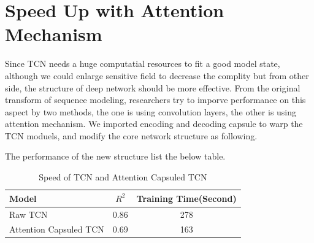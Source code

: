 \section{Speed Up with Attention Mechanism}
Since TCN needs a huge computatial resources to fit a good model state, although we could enlarge sensitive field to decrease the complity but from other side, the structure of deep network should be more effective. From the original transform of sequence modeling, researchers try to imporve performance on this aspect by two methods, the one is using convolution layers, the other is using attention mechanism. We imported encoding and decoding capsule to warp the TCN moduels, and modify the core network structure as following. 

The performance of the new structure list the below table.
\begin{table}[H]
\centering
\caption{Speed of TCN and Attention Capsuled TCN}
\begin{tabular}{l c c}
\toprule
\textbf{Model} & \textbf{$R^2$}& \textbf{Training Time(Second)}\\
\midrule
Raw TCN &0.86& 278\\
Attention Capsuled TCN &0.69 & 163\\
\bottomrule
\end{tabular}
\label{tab:attentionTCN}
\end{table}